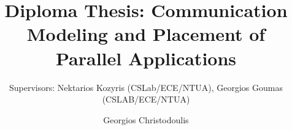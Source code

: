 \documentclass{beamer}
\title[George Christodoulis]{Diploma Thesis: Communication Modeling and Placement of Parallel Applications} %
\subtitle{{\fontsize{8}{6}\selectfont Supervisors: Nektarios Kozyris (CSLab/ECE/NTUA), Georgios Goumas (CSLAB/ECE/NTUA)}}
\author{Georgios Christodoulis} %
\institute[NTUA] %
{
ECE$-$NTUA \\ %
\medskip
\textit{gchristodoulis@gmail.com} %
}
\date{}
\begin{document}
\begin{frame}
\titlepage %
\end{frame}

\end{document}

